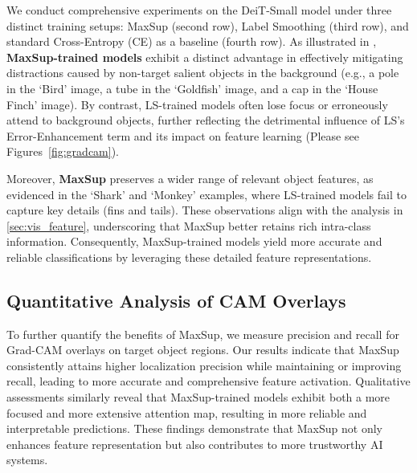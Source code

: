 We conduct comprehensive experiments on the DeiT-Small model under three distinct training setups: MaxSup (second row), Label Smoothing (third row), and standard Cross-Entropy (CE) as a baseline (fourth row). As illustrated in , \textbf{MaxSup-trained models} exhibit a distinct advantage in effectively mitigating distractions caused by non-target salient objects in the background (e.g., a pole in the `Bird' image, a tube in the `Goldfish' image, and a cap in the `House Finch' image). By contrast, LS-trained models often lose focus or erroneously attend to background objects, further reflecting the detrimental influence of LS’s Error-Enhancement term and its impact on feature learning (Please see Figures~\ref{fig:gradcam}).

Moreover, \textbf{MaxSup} preserves a wider range of relevant object features, as evidenced in the `Shark' and `Monkey' examples, where LS-trained models fail to capture key details (fins and tails). These observations align with the analysis in \cref{sec:vis_feature}, underscoring that MaxSup better retains rich intra-class information. Consequently, MaxSup-trained models yield more accurate and reliable classifications by leveraging these detailed feature representations.

\subsection{Quantitative Analysis of CAM Overlays}
To further quantify the benefits of MaxSup, we measure precision and recall for Grad-CAM overlays on target object regions. Our results indicate that MaxSup consistently attains higher localization precision while maintaining or improving recall, leading to more accurate and comprehensive feature activation. Qualitative assessments similarly reveal that MaxSup-trained models exhibit both a more focused and more extensive attention map, resulting in more reliable and interpretable predictions. These findings demonstrate that MaxSup not only enhances feature representation but also contributes to more trustworthy AI systems. 










